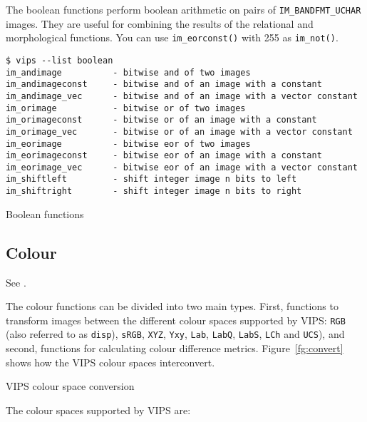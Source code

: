 The boolean functions perform boolean arithmetic on pairs of
\verb+IM_BANDFMT_UCHAR+ images. They are useful for combining the results of
the relational and morphological functions. You can use 
\verb+im_eorconst()+ with 255 as \verb+im_not()+.

\begin{fig2}
\begin{verbatim}
$ vips --list boolean
im_andimage          - bitwise and of two images
im_andimageconst     - bitwise and of an image with a constant
im_andimage_vec      - bitwise and of an image with a vector constant
im_orimage           - bitwise or of two images
im_orimageconst      - bitwise or of an image with a constant
im_orimage_vec       - bitwise or of an image with a vector constant
im_eorimage          - bitwise eor of two images
im_eorimageconst     - bitwise eor of an image with a constant
im_eorimage_vec      - bitwise eor of an image with a vector constant
im_shiftleft         - shift integer image n bits to left
im_shiftright        - shift integer image n bits to right
\end{verbatim}
\caption{Boolean functions}
\label{fg:boolean}
\end{fig2}

\subsection{Colour}
\label{sec:colour}

See .

The colour functions can be divided into two main types. First, functions to
transform images between the different colour spaces supported by VIPS:
\verb+RGB+ (also referred to as \verb+disp+), \verb+sRGB+,  \verb+XYZ+,
\verb+Yxy+, \verb+Lab+, \verb+LabQ+, \verb+LabS+, \verb+LCh+ and
\verb+UCS+), and second, functions for calculating colour difference
metrics. Figure~\ref{fg:convert} shows how the VIPS colour spaces
interconvert.

\begin{fig2}
\caption{VIPS colour space conversion}
\label{fg:convert}
\end{fig2}

The colour spaces supported by VIPS are:

